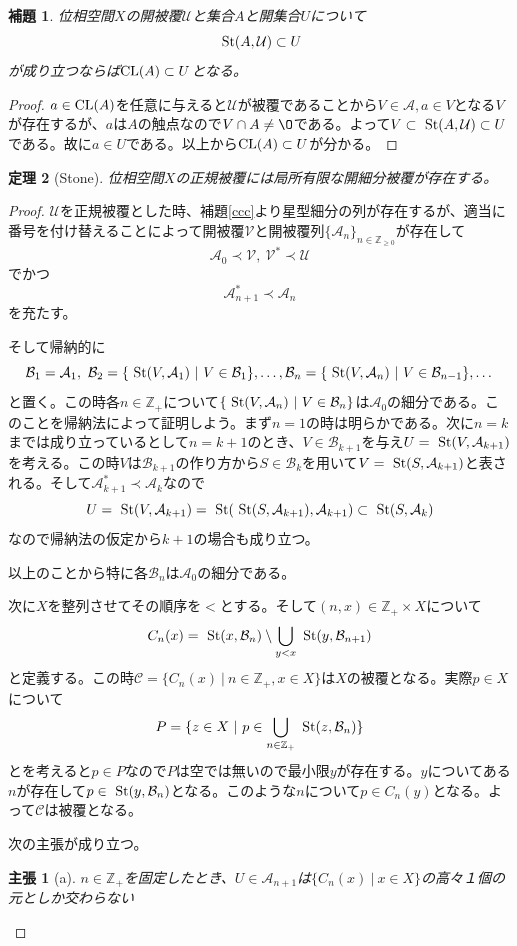 \documentclass[leqno]{jsarticle}
\newtheorem{thm}{定理}
\newtheorem{lem}[thm]{補題}
\newtheorem*{claim}{主張}
\newcommand{\zz}{\mathbb{Z}}
\newcommand{\cl}{\text{{\rm CL}} }
\newcommand{\s}{\text{  {\rm St}} }
\newcommand{\uu}{\mathcal{U}}
\newcommand{\vv}{\mathcal{V}}
\newcommand{\A}{\mathcal{A}}
\newcommand{\B}{\mathcal{B}}
\newcommand{\C}{\mathcal{C}}
\newcommand{\pr}{\prec}
\newcommand{\zp}{\zz_{+}}
\newcommand{\zr}{\zz_{\ge0}}
\begin{document}
\begin{lem}\label{hey}
位相空間$X$の開被覆$\uu$と集合$A$と開集合$U$について
\[
\s(A,\uu)\subset U
\]
が成り立つならば$\cl(A)\subset U$となる。
\end{lem}
\begin{proof}
$a\in \cl(A)$を任意に与えると$\uu$が被覆であることから$V\in \A,a\in V$となる$V$が存在するが、$a$は$A$の触点なので$V\cap A\neq \O$である。よって$V\subset \s(A,\uu)\subset U$である。故に$a\in U$である。以上から$\cl(A)\subset U$が分かる。
\end{proof}

\setcounter{equation}{0}
\begin{thm}[Stone]\label{stone}
位相空間$X$の正規被覆には局所有限な開細分被覆が存在する。
\end{thm}
\begin{proof}
$\uu$を正規被覆とした時、補題\ref{ccc}より星型細分の列が存在するが、適当に番号を付け替えることによって開被覆$\vv$と開被覆列$\{\A_n\}_{n\in \zr}$が存在して
\[
\A_0\pr \vv,\ \vv^{*}\pr\uu
\]
でかつ
\[
\A_{n+1}^{*}\pr\A_n
\]
を充たす。\par
そして帰納的に
\[
\B_1=\A_1,\ \B_2=\{\s(V,\A_1)\ |\ V\in \B_1\},\dots,\B_n=\{\s(V,\A_n)\ |\ V\in \B_{n-1}\},\dots
\]
と置く。この時各$n\in \zp$について$\{\s(V,\A_n)\ |\ V\in\B_n\}$は$\A_0$の細分である。このことを帰納法によって証明しよう。まず$n=1$の時は明らかである。次に$n=k$までは成り立っているとして$n=k+1$のとき、$V\in \B_{k+1}$を与え$U=\s(V,\A_{k+1})$を考える。この時$V$は$\B_{k+1}$の作り方から$S\in \B_k$を用いて$V=\s(S,\A_{k+1})$と表される。そして$\A_{k+1}^{*}\pr \A_k$なので
\[
U=\s(V,\A_{k+1})=\s(\s(S,\A_{k+1}),\A_{k+1})\subset \s(S,\A_k)
\]
なので帰納法の仮定から$k+1$の場合も成り立つ。\par
以上のことから特に各$\B_n$は$\A_0$の細分である。\par
次に$X$を整列させてその順序を$<$とする。そして$(n,x)\in \zp\times X$について
\[
C_n(x)=\s(x,\B_n)\setminus \bigcup_{y<x}\s(y,\B_{n+1})
\]
と定義する。この時$\C=\{C_n(x)\ |\ n\in \zp,x\in X\}$は$X$の被覆となる。実際$p\in X$について
\[
P=\{z\in X\ |\ p\in \bigcup_{n\in \zp}\s(z,\B_n)\}
\]
とを考えると$p\in P$なので$P$は空では無いので最小限$y$が存在する。$y$についてある$n$が存在して$p\in \s(y,\B_n)$となる。このような$n$について$p\in C_n(y)$となる。よって$\C$は被覆となる。\par
次の主張が成り立つ。
\begin{claim}[a]
$n\in \zp$を固定したとき、$U\in \A_{n+1}$は$\{C_n(x)\ |\ x\in X\}$の高々１個の元としか交わらない

\end{claim}
\end{proof}
\end{document}
